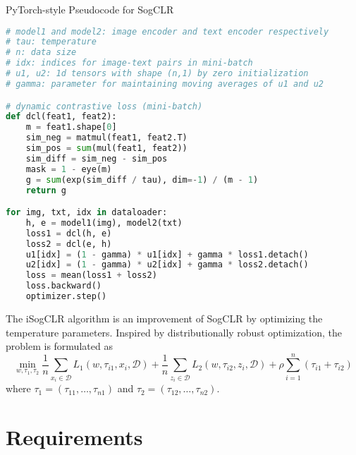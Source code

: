 \documentclass{article}
\begin{document}
\begin{algorithm}[t]
  \caption{PyTorch-style Pseudocode for SogCLR}
  \label{alg:pytorch_sigclr}
  \begin{lstlisting}[language=Python]
# model1 and model2: image encoder and text encoder respectively
# tau: temperature
# n: data size
# idx: indices for image-text pairs in mini-batch
# u1, u2: 1d tensors with shape (n,1) by zero initialization
# gamma: parameter for maintaining moving averages of u1 and u2

# dynamic contrastive loss (mini-batch)
def dcl(feat1, feat2):
    m = feat1.shape[0]
    sim_neg = matmul(feat1, feat2.T)
    sim_pos = sum(mul(feat1, feat2))
    sim_diff = sim_neg - sim_pos
    mask = 1 - eye(m)
    g = sum(exp(sim_diff / tau), dim=-1) / (m - 1)
    return g

for img, txt, idx in dataloader:
    h, e = model1(img), model2(txt)
    loss1 = dcl(h, e)
    loss2 = dcl(e, h)
    u1[idx] = (1 - gamma) * u1[idx] + gamma * loss1.detach()
    u2[idx] = (1 - gamma) * u2[idx] + gamma * loss2.detach()
    loss = mean(loss1 + loss2)
    loss.backward()             
    optimizer.step()
    \end{lstlisting}
\end{algorithm}

The iSogCLR algorithm is an improvement of SogCLR by optimizing the temperature parameters. Inspired by distributionally robust optimization, the problem is formulated as 
\begin{equation}\label{eq:rgcl}
  \min_{w, \tau_1, \tau_2}\frac{1}{n} \sum_{x_i\in \mathcal{D}} L_1(w, \tau_{i1},  x_i, \mathcal{D})+ \frac{1}{n} \sum_{z_i\in \mathcal{D}} L_2(w, \tau_{i2}, z_i, \mathcal{D}) + \rho\sum_{i=1}^n(\tau_{i1} + \tau_{i2})
\end{equation}
where $\tau_1 = (\tau_{11}, \ldots, \tau_{n1})$ and $\tau_2 = (\tau_{12}, \ldots, \tau_{n2})$. 




\section{Requirements}
\end{document}
